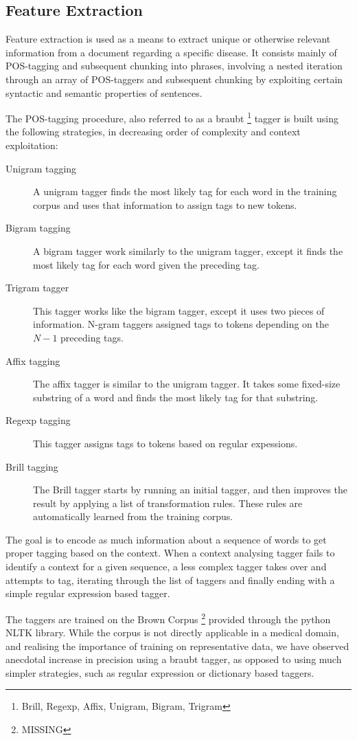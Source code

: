 \documentclass[10pt,letterpaper,final]{article}
\begin{document}
\subsection{Feature Extraction}
Feature extraction is used as a means to extract unique or otherwise
relevant information from a document regarding a specific disease. It
consists mainly of POS-tagging and subsequent chunking into phrases,
involving a nested iteration through an array of POS-taggers and
subsequent chunking by exploiting certain syntactic and semantic
properties of sentences.


The POS-tagging procedure, also referred to as a
braubt \cite{} \footnote{Brill, Regexp, Affix, Unigram, Bigram, Trigram}
tagger is built using the following strategies, in decreasing order of
complexity and context exploitation:
\begin{description}
\item[Unigram tagging] A unigram tagger finds the most likely tag for each word
in the training corpus and uses that information to assign tags to new
tokens.
\item[Bigram tagging] A bigram tagger work similarly to the unigram
tagger, except it finds the most likely tag for each word given the
preceding tag.
\item[Trigram tagger] This tagger works like the bigram tagger, except it
uses two pieces of information. N-gram taggers assigned tags to tokens
depending on the $N - 1$ preceding tags.
\item[Affix tagging] The affix tagger is similar to the unigram tagger.
It takes some fixed-size substring of a word and finds the most likely
tag for that substring.
\item[Regexp tagging] This tagger assigns tags to tokens based on regular
expessions.
\item[Brill tagging] The Brill\cite{Brill:1992:SRP:974499.974526} tagger
starts by running an initial tagger, and then improves the result by
applying a list of transformation rules. These rules are automatically
learned from the training corpus.
 \end{description}
The goal is to encode as much information about a sequence of words to
get proper tagging based on the context. When a context analysing tagger
fails to identify a context for a given sequence, a less complex tagger
takes over and attempts to tag, iterating through the list of taggers
and finally ending with a simple regular expression based tagger.

The taggers are trained on the Brown Corpus \footnote{MISSING} provided
through the python NLTK library. While the corpus is not directly
applicable in a medical domain, and realising the importance of training
on representative data, we have observed anecdotal increase in precision
using a braubt tagger, as opposed to using much simpler strategies, such
as regular expression or dictionary based taggers.
\end{document}
